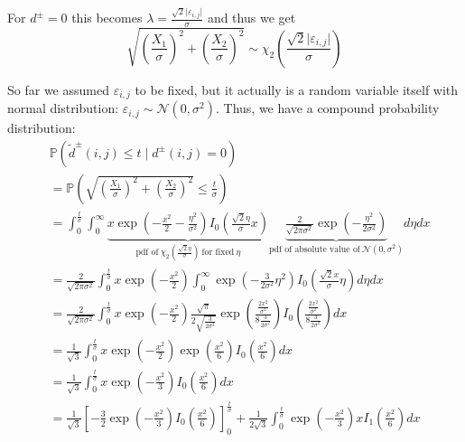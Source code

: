 \documentclass[a4paper,12pt]{article}
\newcommand{\abs}[1]{\lvert#1\rvert}
\theoremstyle{plain}
\theoremstyle{definition}
\theoremstyle{remark}
\begin{document}
For $d^\pm = 0$ this becomes $\lambda = \frac{\sqrt{2} \abs{\varepsilon_{i, j}}}{\sigma}$ and thus we get
\begin{equation*}
	\sqrt{\left( \frac{X_1}{\sigma} \right)^2 + \left( \frac{X_2}{\sigma} \right)^2} \sim \chi_2 \left( \frac{\sqrt{2} \abs{\varepsilon_{i, j}}}{\sigma} \right)
\end{equation*}

So far we assumed $\varepsilon_{i, j}$ to be fixed, but it actually is a random variable itself with normal distribution: $\varepsilon_{i, j} \sim \mathcal{N}(0, \sigma^2)$. Thus, we have a compound probability distribution:
\begin{align*}
	&\mathbb{P}(\tilde{d}^\pm(i, j) \leq t \mid d^\pm(i, j) = 0) \\
	&= \mathbb{P}\left( \sqrt{\left( \frac{X_1}{\sigma} \right)^2 + \left( \frac{X_2}{\sigma} \right)^2} \leq \frac{t}{\sigma} \right) \\
	&= \int_0^\frac{t}{\sigma} \int_0^\infty \underbrace{x \exp \left( - \frac{x^2}{2} - \frac{\eta^2}{\sigma^2} \right) I_0 \left( \frac{\sqrt{2} \eta}{\sigma} x \right)}_{\textrm{pdf of} \ \chi_2 \left( \frac{\sqrt{2} \eta}{\sigma} \right) \ \textrm{for fixed} \ \eta} \underbrace{\frac{2}{\sqrt{2 \pi \sigma^2}} \exp \left( - \frac{\eta^2}{2 \sigma^2} \right)}_{\textrm{pdf of absolute value of} \ \mathcal{N}(0, \sigma^2)} d\eta dx \\
	&= \frac{2}{\sqrt{2 \pi \sigma^2}} \int_0^\frac{t}{\sigma} x \exp \left( - \frac{x^2}{2} \right) \int_0^\infty \exp \left( - \frac{3}{2 \sigma^2} \eta^2 \right) I_0 \left( \frac{\sqrt{2} x}{\sigma} \eta \right) d\eta dx \\
	&= \frac{2}{\sqrt{2 \pi \sigma^2}} \int_0^\frac{t}{\sigma} x \exp \left( - \frac{x^2}{2} \right) \frac{\sqrt{\pi}}{2 \sqrt{\frac{3}{2 \sigma^2}}} \exp \left( \frac{\frac{2 x^2}{\sigma^2}}{8 \frac{3}{2 \sigma^2}} \right) I_0 \left( \frac{\frac{2 x^2}{\sigma^2}}{8 \frac{3}{2 \sigma^2}} \right) dx \\
	&= \frac{1}{\sqrt{3}} \int_0^\frac{t}{\sigma} x \exp \left( - \frac{x^2}{2} \right) \exp \left( \frac{x^2}{6} \right) I_0 \left( \frac{x^2}{6} \right) dx \\
	&= \frac{1}{\sqrt{3}} \int_0^\frac{t}{\sigma} x \exp \left( - \frac{x^2}{3} \right) I_0 \left( \frac{x^2}{6} \right) dx \\
	&= \frac{1}{\sqrt{3}} \left[ - \frac{3}{2} \exp \left( - \frac{x^2}{3} \right) I_0 \left( \frac{x^2}{6} \right) \right]_0^\frac{t}{\sigma} + \frac{1}{2 \sqrt{3}} \int_0^\frac{t}{\sigma} \exp \left( - \frac{x^2}{3} \right) x I_1 \left( \frac{x^2}{6} \right) dx \\

\end{align*}
\end{document}

